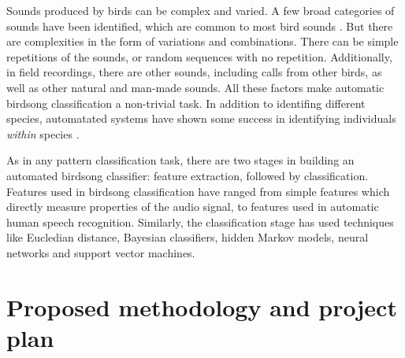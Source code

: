 \documentclass{article}
\begin{document}

Sounds produced by birds can be complex and varied. A few broad categories of
sounds have been identified, which are common to most bird sounds
\cite{brandes_automatedSoundRecording2008}. But there are complexities in the
form of variations and combinations. There can be simple repetitions of the
sounds, or random sequences with no repetition.  Additionally, in field
recordings, there are other sounds, including calls from other birds, as well as
other natural and man-made sounds. All these factors make automatic birdsong
classification a non-trivial task. In addition to identifing different species,
automatated systems have shown some success in identifying individuals
\emph{within} species \cite{kirschel_territorial2011}.

As in any pattern classification task, there are two stages in building an
automated birdsong classifier: feature extraction, followed by classification.
Features used in birdsong classification have ranged from simple features which
directly measure properties of the audio signal, to features used in automatic
human speech recognition. Similarly, the classification stage has used
techniques like Eucledian distance, Bayesian classifiers, hidden Markov models, neural networks and support vector machines.




\section{Proposed methodology and project plan}
\end{document}
